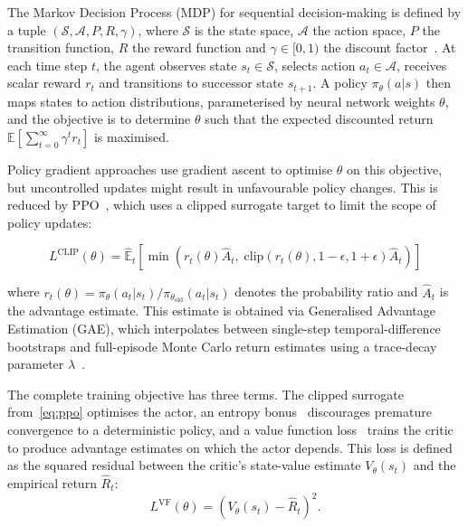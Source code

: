 \documentclass{sig-alternate}
\begin{document}
The Markov Decision Process (MDP) for sequential decision-making is defined by a tuple $(\mathcal{S}, \mathcal{A}, P, R, \gamma)$, where $\mathcal{S}$ is the state space, $\mathcal{A}$ the action space, $P$ the transition function, $R$ the reward function and $\gamma \in [0,1)$ the discount factor~\cite{sutton2018rl, thrun2005probabilistic}. At each time step $t$, the agent observes state $s_t \in \mathcal{S}$, selects action $a_t \in \mathcal{A}$, receives scalar reward $r_t$ and transitions to successor state $s_{t+1}$. A policy $\pi_\theta(a|s)$ then maps states to action distributions, parameterised by neural network weights $\theta$, and the objective is to determine $\theta$ such that the expected discounted return $\mathbb{E}[\sum_{t=0}^{\infty} \gamma^t r_t]$ is maximised. 

Policy gradient approaches use gradient ascent to optimise $\theta$ on this objective, but uncontrolled updates might result in unfavourable policy changes. This is reduced by PPO~\cite{schulman2017ppo}, which uses a clipped surrogate target to limit the scope of policy updates:

\begin{equation}
    L^{\text{CLIP}}(\theta) = \hat{\mathbb{E}}_t \left[ \min \left( r_t(\theta) \hat{A}_t, \; \text{clip}(r_t(\theta), 1{-}\epsilon, 1{+}\epsilon) \hat{A}_t \right) \right]
    \label{eq:ppo}
\end{equation}

\noindent where $r_t(\theta) = \pi_\theta(a_t|s_t) / \pi_{\theta_{\text{old}}}(a_t|s_t)$ denotes the probability ratio and $\hat{A}_t$ is the advantage estimate. This estimate is obtained via Generalised Advantage Estimation (GAE), which interpolates between single-step temporal-difference bootstraps and full-episode Monte Carlo return estimates using a trace-decay parameter $\lambda$~\cite{schulman2015gae}.

The complete training objective has three terms. The clipped surrogate from~\cref{eq:ppo} optimises the actor, an entropy bonus~\cite{mnih2016a3c} discourages premature convergence to a deterministic policy, and a value function loss~\cite{schulman2017ppo} trains the critic to produce advantage estimates on which the actor depends. This loss is defined as the squared residual between the critic's state-value estimate $V_\theta(s_t)$ and the empirical return $\hat{R}_t$:
\begin{equation}
    L^{\text{VF}}(\theta) = \left( V_\theta(s_t) - \hat{R}_t \right)^2.
\label{eq:vf_loss}
\end{equation}
\end{document}
